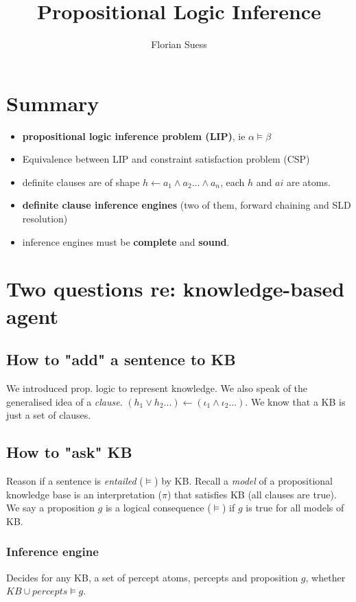 \documentclass{article}
\begin{document}
\title{Propositional Logic Inference}
\date{}
\author{Florian Suess}
\maketitle

\section{Summary}

\begin{itemize}
	\item \textbf{propositional logic inference problem (LIP)}, ie $\alpha \vDash \beta$
	\item Equivalence between LIP and constraint satisfaction problem (CSP)
	\item definite clauses are of shape $h \leftarrow a_1 \land a_2 ... \land a_n$, each $h$ and $ai$ are atoms.
	\item \textbf{definite clause inference engines} (two of them, forward chaining and SLD resolution)
	\item inference engines must be \textbf{complete} and \textbf{sound}.
\end{itemize}

\section{Two questions re: knowledge-based agent}

\subsection{How to "add" a sentence to KB}
We introduced prop. logic to represent knowledge. We also speak of the generalised idea of a \emph{clause}. $(h_1 \lor h_2 ...) \leftarrow (\iota_1 \land \iota_2 ...)$. We know that a KB is just a set of clauses.
\subsection{How to "ask" KB}
Reason if a sentence is \emph{entailed} ($\vDash$) by KB. Recall a \emph{model} of a propositional knowledge base is an interpretation ($\pi$) that satisfies KB (all clauses are true). We say a proposition $g$ is a logical consequence ($\vDash$) if $g$ is true for all models of KB.
\subsubsection{Inference engine}
Decides for any KB, a set of percept atoms, percepts and proposition $g$, whether $KB \cup percepts \vDash g$.
\end{document}
